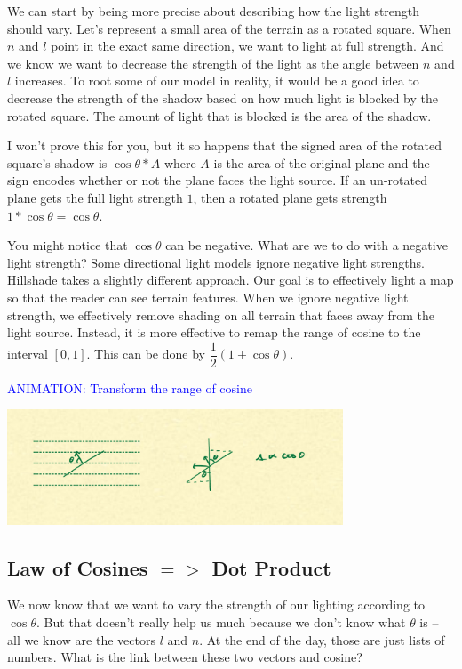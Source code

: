 \documentclass{article}
\newcommand\animation[1]{\textcolor{blue}{ANIMATION: #1}}
\begin{document}
We can start by being more precise about describing how the light strength should vary.
Let's represent a small area of the terrain as a rotated square.
When $n$ and $l$ point in the exact same direction, we want to light at full strength.
And we know we want to decrease the strength of the light as the angle between $n$ and $l$ increases.
To root some of our model in reality, it would be a good idea to decrease the strength of the shadow based on how much light is blocked by the rotated square.
The amount of light that is blocked is the area of the shadow.

I won't prove this for you, but it so happens that the signed area of the rotated square's shadow is $\cos \theta * A$ where $A$ is the area of the original plane and the sign encodes whether or not the plane faces the light source.
If an un-rotated plane gets the full light strength $1$, then a rotated plane gets strength $1 * \cos \theta = \cos \theta$.

You might notice that $\cos \theta$ can be negative.
What are we to do with a negative light strength?
Some directional light models ignore negative light strengths.
Hillshade takes a slightly different approach.
Our goal is to effectively light a map so that the reader can see terrain features.
When we ignore negative light strength, we effectively remove shading on all terrain that faces away from the light source.
Instead, it is more effective to remap the range of cosine to the interval $[0, 1]$.
This can be done by $\dfrac{1}{2}(1 + \cos \theta)$.
 
\animation{Transform the range of cosine}

\begin{center}
	\includegraphics[width=0.75\textwidth,frame]{assets/cosine.jpg}
\end{center}

\subsection{Law of Cosines $=>$ Dot Product}

We now know that we want to vary the strength of our lighting according to $\cos \theta$.
But that doesn't really help us much because we don't know what $\theta$ is -- all we know are the vectors $l$ and $n$.
At the end of the day, those are just lists of numbers.
What is the link between these two vectors and cosine?
\end{document}
